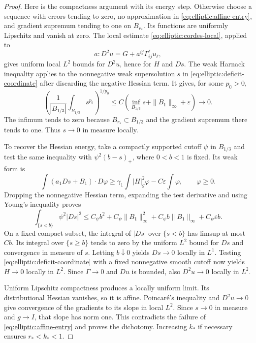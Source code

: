 \begin{proof}
Here is the compactness argument with its energy step.  Otherwise choose
a sequence with errors tending to zero, no approximation in
\eqref{eq:elliptic:affine-entry}, and gradient supremum tending
to one on $B_{r_*}$.  Its functions are uniformly Lipschitz and vanish
at zero.  The local estimate \eqref{eq:elliptic:cordes-local}, applied to
\[
 a:D^2u=G+a^{ij}\Gamma^\ell_{ij}u_\ell,
\]
gives uniform local $L^2$ bounds for $D^2u$, hence for $H$ and $Ds$.
The weak Harnack inequality applies to the nonnegative weak
supersolution $s$ in \eqref{eq:elliptic:deficit-coordinate}
after discarding the negative Hessian term.  It gives, for some $p_0>0$,
\[
 \left(\frac1{|B_{1/3}|}\int_{B_{1/3}}s^{p_0}\right)^{1/p_0}
   \leq C\left(\inf_{B_{1/3}}s+\|B_1\|_\infty+\varepsilon\right)
   \longrightarrow0.
\]
The infimum tends to zero because $B_{r_*}\subset B_{1/3}$ and the
gradient supremum there tends to one.  Thus $s\to0$ in measure locally.

To recover the Hessian energy, take a compactly supported cutoff $\psi$
in $B_{1/3}$ and test the same inequality with
$\psi^2(b-s)_+$, where $0<b<1$ is fixed.  Its weak form is
\[
 \int(a_1Ds+B_1)\cdot D\varphi
    \geq\gamma_1\int|H|_g^2\varphi-C\varepsilon\int\varphi,
 \qquad\varphi\geq0.
\]
Dropping the nonnegative Hessian term, expanding the test derivative and
using Young's inequality proves
\begin{equation}
 \int_{\{s<b\}}\psi^2|Ds|^2
   \leq C_\psi b^2+C_\psi\|B_1\|_\infty^2
          +C_\psi b\|B_1\|_\infty+C_\psi\varepsilon b.
 \label{eq:elliptic:lower-truncation}
\end{equation}
On a fixed compact subset, the integral of $|Ds|$ over $\{s<b\}$ has
limsup at most $Cb$.  Its integral over $\{s\geq b\}$ tends to zero
by the uniform $L^2$ bound for $Ds$ and convergence in measure of $s$.
Letting $b\downarrow0$ yields $Ds\to0$ locally in $L^1$.
Testing \eqref{eq:elliptic:deficit-coordinate} with a fixed
nonnegative smooth cutoff now yields $H\to0$ locally in $L^2$.
Since $\Gamma\to0$ and $Du$ is bounded, also $D^2u\to0$ locally in
$L^2$.

Uniform Lipschitz compactness produces a locally uniform limit.  Its
distributional Hessian vanishes, so it is affine.  Poincar\'e's inequality
and $D^2u\to0$ give convergence of the gradients to its slope in local
$L^2$.  Since $s\to0$ in measure and $g\to I$, that slope has norm one.
This contradicts the failure of \eqref{eq:elliptic:affine-entry}
and proves the dichotomy.  Increasing $k_*$ if necessary ensures
$r_*<k_*<1$.


\end{proof}
